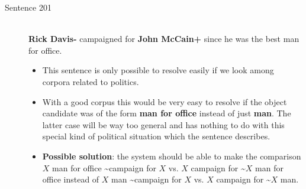 \documentclass{article}
\newcommand{\insertcode}[2]{\begin{itemize}\item[]\end{itemize}} %
\begin{document}
\begin{description}
  \item[Sentence 201] \hfill \\
  {\bf Rick Davis-} campaigned for {\bf John McCain+} since he was the best man for office.
  \begin{itemize}
  	\item This sentence is only possible to resolve easily if we look among corpora related to politics.
  	\item With a good corpus this would be very easy to resolve if the object candidate was of the form {\bf man for office} instead of just {\bf man}. The latter case will be way too general and has nothing to do with this special kind of political situation which the sentence describes.
  	\item {\bf Possible solution}: the system should be able to make the comparison $X$ man for office \sim campaign for $X$ vs. $X$ campaign for \sim $X$ man for office instead of $X$ man \sim campaign for $X$ vs. $X$ campaign for \sim $X$ man. 
  \end{itemize}

  \begin{comment}

  \item[Example 200] \hfill \\
  {\bf John+} tricked {\bf Bill-} because he was mischievous.
  \begin{itemize}
  	\item lol
  	\item \insertcode{"Scripts/example.pl"}{Example}
  	\item Possible solution: roflmao idk
  \end{itemize}

  \end{comment}

\end{description}

\end{document}
